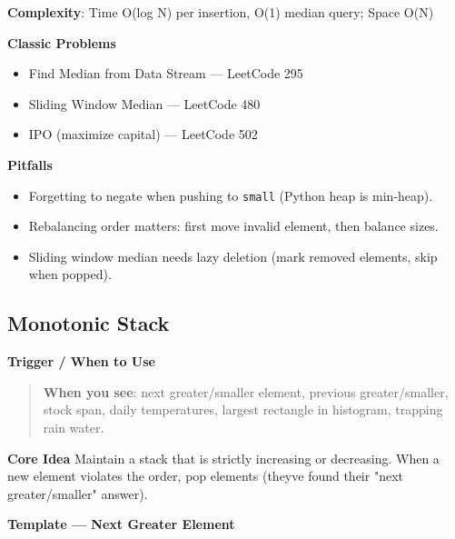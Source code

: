 \documentclass[11pt]{article}
\providecommand{\tightlist}{\setlength{\itemsep}{1pt}\setlength{\parskip}{0pt}}
\begin{document}
\textbf{Complexity}: Time O(log N) per insertion, O(1) median query; Space O(N)

\textbf{Classic Problems}

\begin{itemize}
\tightlist
\item
  Find Median from Data Stream --- LeetCode 295
\item
  Sliding Window Median --- LeetCode 480
\item
  IPO (maximize capital) --- LeetCode 502
\end{itemize}

\textbf{Pitfalls}

\begin{itemize}
\tightlist
\item
  Forgetting to negate when pushing to \texttt{small} (Python heap is min-heap).
\item
  Rebalancing order matters: first move invalid element, then balance sizes.
\item
  Sliding window median needs lazy deletion (mark removed elements, skip when popped).
\end{itemize}

\subsection{Monotonic Stack}\label{monotonic-stack}

\textbf{Trigger / When to Use}

\begin{quote}
\textbf{When you see}: next greater/smaller element, previous greater/smaller, stock span, daily temperatures, largest rectangle in histogram, trapping rain water.
\end{quote}

\textbf{Core Idea}
Maintain a stack that is strictly increasing or decreasing. When a new element violates the order, pop elements (they\textquotesingle ve found their "next greater/smaller" answer).

\textbf{Template --- Next Greater Element}

\end{document}
